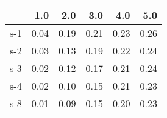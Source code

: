 \begin{tabular}{lrrrrr}
\toprule
{} &  1.0 &  2.0 &  3.0 &  4.0 &  5.0 \\
\midrule
s-1 & 0.04 & 0.19 & 0.21 & 0.23 & 0.26 \\
s-2 & 0.03 & 0.13 & 0.19 & 0.22 & 0.24 \\
s-3 & 0.02 & 0.12 & 0.17 & 0.21 & 0.24 \\
s-4 & 0.02 & 0.10 & 0.15 & 0.21 & 0.23 \\
s-8 & 0.01 & 0.09 & 0.15 & 0.20 & 0.23 \\
\bottomrule
\end{tabular}
